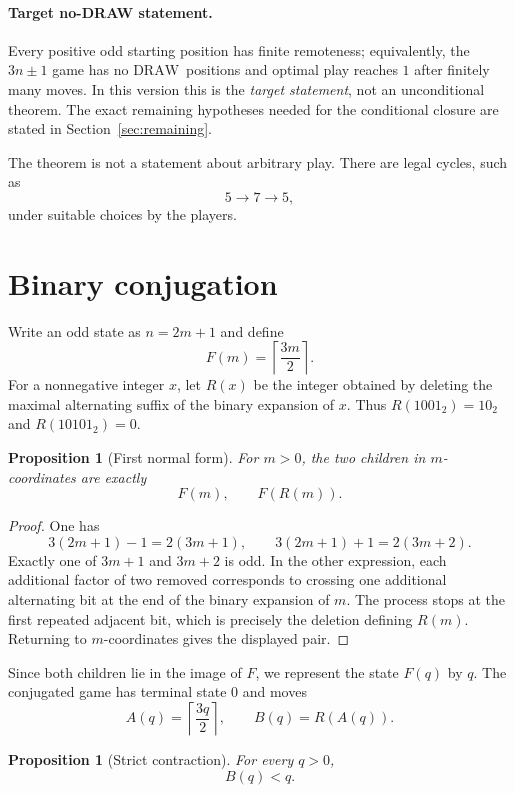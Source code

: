 \documentclass[11pt]{article}
\newtheorem{proposition}[theorem]{Proposition}
\newcommand{\DRAW}{\ensuremath{\mathrm{DRAW}}}
\begin{document}
\paragraph{Target no-DRAW statement.}\label{target:nodraw}
Every positive odd starting position has finite remoteness; equivalently, the
$3n\pm1$ game has no \DRAW\ positions and optimal play reaches $1$ after
finitely many moves.  In this version this is the \emph{target statement},
not an unconditional theorem.  The exact remaining hypotheses needed for the
conditional closure are stated in Section~\ref{sec:remaining}.

The theorem is not a statement about arbitrary play. There are legal cycles,
such as
\[
  5\longrightarrow 7\longrightarrow 5,
\]
under suitable choices by the players.

\section{Binary conjugation}

Write an odd state as $n=2m+1$ and define
\[
  F(m)=\left\lceil\frac{3m}{2}\right\rceil .
\]
For a nonnegative integer $x$, let $R(x)$ be the integer obtained by deleting
the maximal alternating suffix of the binary expansion of $x$. Thus
$R(1001_2)=10_2$ and $R(10101_2)=0$.

\begin{proposition}[First normal form]\label{prop:first-normal}
For $m>0$, the two children in $m$-coordinates are exactly
\[
  F(m),\qquad F(R(m)).
\]
\end{proposition}

\begin{proof}
One has
\[
  3(2m+1)-1=2(3m+1),\qquad
  3(2m+1)+1=2(3m+2).
\]
Exactly one of $3m+1$ and $3m+2$ is odd. In the other expression, each
additional factor of two removed corresponds to crossing one additional
alternating bit at the end of the binary expansion of $m$. The process stops
at the first repeated adjacent bit, which is precisely the deletion defining
$R(m)$. Returning to $m$-coordinates gives the displayed pair.
\end{proof}

Since both children lie in the image of $F$, we represent the state $F(q)$ by
$q$. The conjugated game has terminal state $0$ and moves
\[
  A(q)=\left\lceil\frac{3q}{2}\right\rceil,
  \qquad
  B(q)=R(A(q)).
\]

\begin{proposition}[Strict contraction]\label{prop:B-contracts}
For every $q>0$,
\[
  B(q)<q.
\]
\end{proposition}
\end{document}
